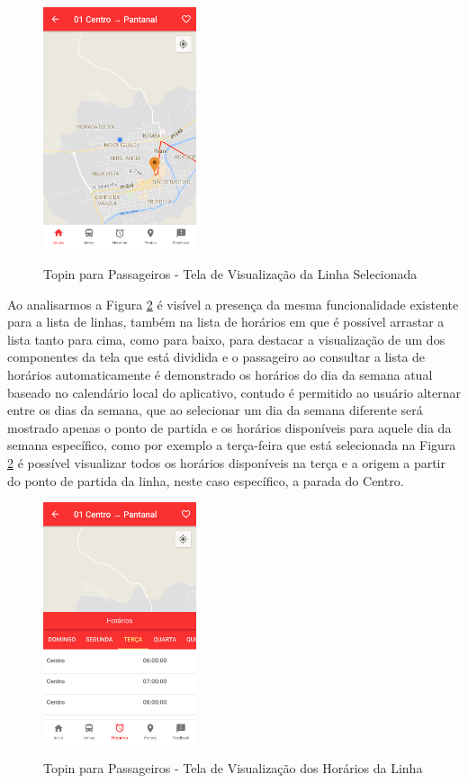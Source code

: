 {{{{{{{\begin{figure}[H]
\caption{Topin para Passageiros - Tela de Visualização da Linha Selecionada}
\centering
\includegraphics[width=0.4\textwidth]{imagens/visualizacao-linha.png}
\label{fig:passageiro-visualizacao-linha}
\end{figure}

Ao analisarmos a Figura \ref{fig:passageiro-horarios-linha} é visível a presença da mesma funcionalidade existente para a lista de linhas, também na lista de horários em que é possível arrastar a lista tanto para cima, como para baixo, para destacar a visualização de um dos componentes da tela que está dividida e o passageiro ao consultar a lista de horários automaticamente é demonstrado os horários do dia da semana atual baseado no calendário local do aplicativo, contudo é permitido ao usuário alternar entre os dias da semana, que ao selecionar um dia da semana diferente será mostrado apenas o ponto de partida e os horários disponíveis para aquele dia da semana específico, como por exemplo a terça-feira que está selecionada na Figura \ref{fig:passageiro-horarios-linha} é possível visualizar todos os horários disponíveis na terça e a origem a partir do ponto de partida da linha, neste caso específico, a parada do Centro.

\begin{figure}[H]
\caption{Topin para Passageiros - Tela de Visualização dos Horários da Linha}
\centering
\includegraphics[width=0.4\textwidth]{imagens/horarios-linha.png}
\label{fig:passageiro-horarios-linha}
\end{figure}

}}}}}}}
